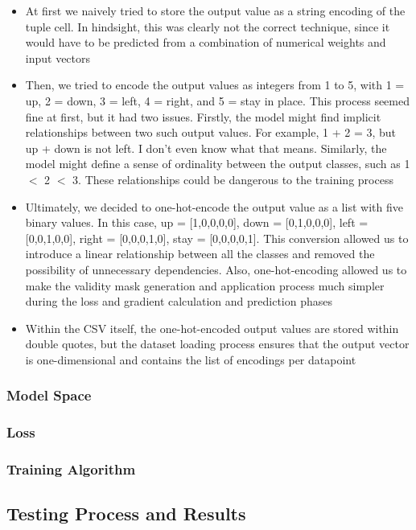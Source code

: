 \documentclass[11pt]{article}
\begin{document}
\begin{itemize}
    \item At first we naively tried to store the output value as a string encoding of the tuple cell. In hindsight, this was clearly not the correct technique, since it would have to be predicted from a combination of numerical weights and input vectors
    \item Then, we tried to encode the output values as integers from 1 to 5, with 1 = up, 2 = down, 3 = left, 4 = right, and 5 = stay in place. This process seemed fine at first, but it had two issues. Firstly, the model might find implicit relationships between two such output values. For example, 1 + 2 = 3, but up + down is not left. I don't even know what that means. Similarly, the model might define a sense of ordinality between the output classes, such as 1 $<$ 2 $<$ 3. These relationships could be dangerous to the training process
    \item Ultimately, we decided to one-hot-encode the output value as a list with five binary values. In this case, up = [1,0,0,0,0], down = [0,1,0,0,0], left = [0,0,1,0,0], right = [0,0,0,1,0], stay = [0,0,0,0,1]. This conversion allowed us to introduce a linear relationship between all the classes and removed the possibility of unnecessary dependencies. Also, one-hot-encoding allowed us to make the validity mask generation and application process much simpler during the loss and gradient calculation and prediction phases
    \item Within the CSV itself, the one-hot-encoded output values are stored within double quotes, but the dataset loading process ensures that the output vector is one-dimensional and contains the list of encodings per datapoint
\end{itemize}

\subsubsection{Model Space}

\subsubsection{Loss}

\subsubsection{Training Algorithm}

\subsection{Testing Process and Results}
\end{document}
